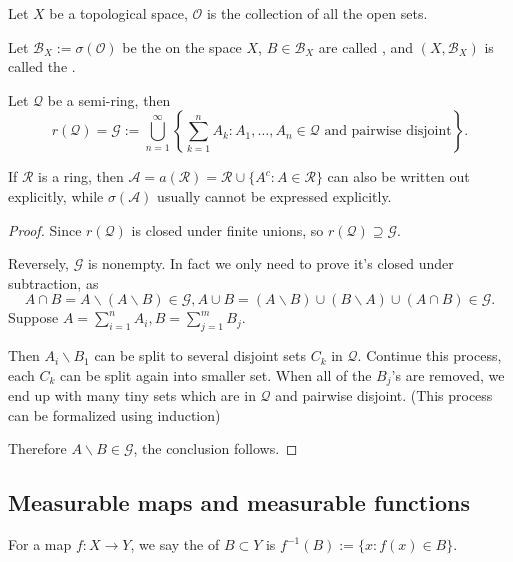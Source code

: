 Let $X$ be a topological space,  $\mathscr{O}$ is the collection of all the
open sets.

Let $\mathscr{B}_X:=\sigma(\mathscr{O})$ be the 
on the space $X$,  $B\in \mathscr{B}_X$ are called ,
and  $(X, \mathscr{B}_X)$ is called the .

\begin{theorem}
    Let $ \mathscr{Q}$ be a semi-ring, then
	\[
	r(\mathscr{Q}) = \mathscr{G} := \bigcup_{n=1}^\infty \left\{\sum_{k=1}^n A_k:
	A_1,\dots,A_n\in \mathscr{Q} \text{ and pairwise disjoint}\right\}.
	\]
\end{theorem}
\begin{remark}
    If $\mathscr{R}$ is a ring, then $\mathscr{A}=a(\mathscr{R})=\mathscr{R}\cup
	\{A^c: A\in \mathscr{R}\}$ can also be written out explicitly,
	while $\sigma(\mathscr{A})$ usually cannot be expressed explicitly.
\end{remark}
\begin{proof}[Proof]
    Since $r(\mathscr{Q})$ is closed under finite unions,
	so $r(\mathscr{Q})\supseteq \mathscr{G}$.

	Reversely, $\mathscr{G}$ is nonempty.
	In fact we only need to prove it's closed under subtraction,
	as \[
	A\cap B = A \backslash (A\backslash B)\in \mathscr{G},
	A\cup B = (A\backslash B)\cup (B\backslash A)\cup (A\cap B)\in \mathscr{G}.
	\]
	Suppose $A = \sum_{i=1}^n A_i, B = \sum_{j=1}^m B_j$.

	Then $A_i\backslash B_1$ can be split to several disjoint sets $C_k$ in $\mathscr{Q}$.
	Continue this process, each $C_k$ can be split again into smaller set.
	When all of the $B_j$'s are removed, we end up with many tiny sets
	which are in  $\mathscr{Q}$ and pairwise disjoint.
	(This process can be formalized using induction)

	Therefore $A\backslash B\in \mathscr{G}$, the conclusion follows.
\end{proof}

\subsection{Measurable maps and measurable functions}
\label{sub:Measurable maps and measurable functions}
For a map $f:X\to Y$, we say the  of $B \subset Y$
is $f^{-1}(B) := \{x: f(x)\in B\}$.

